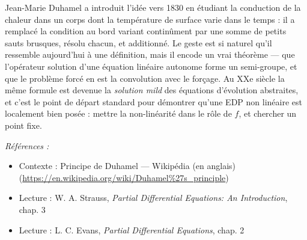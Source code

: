 \documentclass[11pt]{article}
\newenvironment{refs}{\par\small\noindent\emph{Références :}\begin{itemize}\setlength\itemsep{0pt}}{\end{itemize}\normalsize}
\begin{document}
\noindent Jean-Marie Duhamel a introduit l'idée vers 1830 en étudiant
la conduction de la chaleur dans un corps dont la température de surface varie dans le temps : il
a remplacé la condition au bord variant continûment par une somme de petits sauts brusques, résolu
chacun, et additionné. Le geste est si naturel qu'il ressemble aujourd'hui à une définition, mais
il encode un vrai théorème --- que l'opérateur solution d'une équation linéaire autonome forme un
semi-groupe, et que le problème forcé en est la convolution avec le forçage. Au
XXe siècle la même formule est devenue la \textit{solution mild} des équations
d'évolution abstraites, et c'est le point de départ standard pour démontrer qu'une EDP non
linéaire est localement bien posée : mettre la non-linéarité dans le rôle de $f$, et
chercher un point fixe.

\begin{refs}
\item Contexte : Principe de Duhamel --- Wikipédia (en anglais) (\url{https://en.wikipedia.org/wiki/Duhamel%27s_principle})
\item Lecture : W. A. Strauss, \textit{Partial Differential Equations: An Introduction}, chap. 3
\item Lecture : L. C. Evans, \textit{Partial Differential Equations}, chap. 2
\end{refs}

\bigskip
\end{document}
